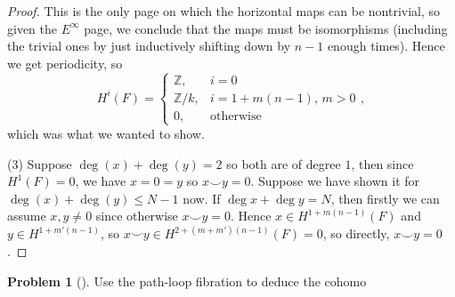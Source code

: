 \documentclass[reqno]{amsart}
\theoremstyle{definition}
\newtheorem{problem}[theorem]{Problem}
\theoremstyle{remark}
\begin{document}
\begin{proof}
This is the only page on which the horizontal maps
can be nontrivial, so given the
$E^{\infty}$ page, we conclude that the
maps must be isomorphisms (including the trivial ones
by just inductively shifting down
by $n-1$ enough times).
Hence we get periodicity, so
\[
H^{i}(F) =
\begin{cases}
    \mathbb{Z},& i=0\\
    \mathbb{Z} /k,& i = 1+m(n-1), \, m>0\\
    0,& \text{otherwise}
\end{cases},
\] 
which was what we wanted to show.\\
\linebreak





(3) Suppose $\deg (x) + \deg (y) = 2$ so both are of 
degree $1$, then
since $H^{1}(F) = 0$, we have $x=0=y$ so
$x \smile y = 0$.
Suppose we have shown it for
$\deg (x) + \deg (y) \le N-1$ now. If
$\deg x + \deg y = N$, then
firstly we can assume
$x,y\neq 0$ since otherwise
$x \smile y = 0$. Hence
$x \in H^{1+ m(n-1)}(F)$ and
$y \in H^{1+m'(n-1)}$, so
$x \smile y \in 
H^{2 + (m+m')(n-1)}(F) = 0$, so directly,
$x \smile y = 0$.



\end{proof}


\begin{problem}[]
    Use the path-loop fibration to deduce the
    cohomo
\end{problem}






\end{document}
